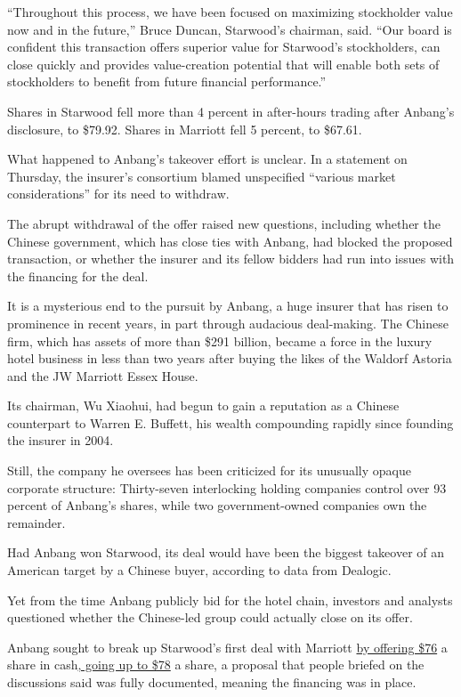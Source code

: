 ``Throughout this process, we have been focused on maximizing
stockholder value now and in the future,'' Bruce Duncan, Starwood's
chairman, said. ``Our board is confident this transaction offers
superior value for Starwood's stockholders, can close quickly and
provides value-creation potential that will enable both sets of
stockholders to benefit from future financial performance.''

Shares in Starwood fell more than 4 percent in after-hours trading after
Anbang's disclosure, to \$79.92. Shares in Marriott fell 5 percent, to
\$67.61.

What happened to Anbang's takeover effort is unclear. In a statement on
Thursday, the insurer's consortium blamed unspecified ``various market
considerations'' for its need to withdraw.

The abrupt withdrawal of the offer raised new questions, including
whether the Chinese government, which has close ties with Anbang, had
blocked the proposed transaction, or whether the insurer and its fellow
bidders had run into issues with the financing for the deal.

It is a mysterious end to the pursuit by Anbang, a huge insurer that has
risen to prominence in recent years, in part through audacious
deal-making. The Chinese firm, which has assets of more than \$291
billion, became a force in the luxury hotel business in less than two
years after buying the likes of the Waldorf Astoria and the JW Marriott
Essex House.

Its chairman, Wu Xiaohui, had begun to gain a reputation as a Chinese
counterpart to Warren E. Buffett, his wealth compounding rapidly since
founding the insurer in 2004.

Still, the company he oversees has been criticized for its unusually
opaque corporate structure: Thirty-seven interlocking holding companies
control over 93 percent of Anbang's shares, while two government-owned
companies own the remainder.

Had Anbang won Starwood, its deal would have been the biggest takeover
of an American target by a Chinese buyer, according to data from
Dealogic.

Yet from the time Anbang publicly bid for the hotel chain, investors and
analysts questioned whether the Chinese-led group could actually close
on its offer.

Anbang sought to break up Starwood's first deal with Marriott
\href{http://www.nytimes.com/2016/03/15/business/dealbook/starwood-receives-unsolicited-bid-putting-marriott-plan-in-doubt.html}{by
offering \$76} a share in
cash\href{http://www.nytimes.com/2016/03/19/business/dealbook/starwood-says-rivals-counteroffer-tops-bid-from-marriott.html}{,
going up to \$78} a share, a proposal that people briefed on the
discussions said was fully documented, meaning the financing was in
place.


